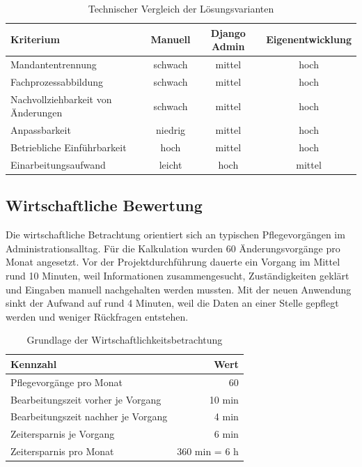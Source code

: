 \begin{table}[htbp]
\centering
\begin{tabular}{|p{4.6cm}|c|c|c|}
\hline
\textbf{Kriterium} & \textbf{Manuell} & \textbf{Django Admin} & \textbf{Eigenentwicklung} \\
\hline
Mandantentrennung & schwach & mittel & hoch \\
\hline
Fachprozessabbildung & schwach & mittel & hoch \\
\hline
Nachvollziehbarkeit von Änderungen & schwach & mittel & hoch \\
\hline
Anpassbarkeit & niedrig & mittel & hoch \\
\hline
Betriebliche Einführbarkeit & hoch & mittel & hoch \\
\hline
Einarbeitungsaufwand & leicht & hoch & mittel \\
\hline
\end{tabular}
\caption{Technischer Vergleich der Lösungsvarianten}
\label{tab:TechnischerVergleich}
\end{table}

\subsection{Wirtschaftliche Bewertung}
\label{sec:WirtschaftlicheBewertung}
Die wirtschaftliche Betrachtung orientiert sich an typischen Pflegevorgängen
im Administrationsalltag. Für die Kalkulation wurden 60 Änderungsvorgänge pro
Monat angesetzt. Vor der Projektdurchführung dauerte ein Vorgang im Mittel
rund 10 Minuten, weil Informationen zusammengesucht, Zuständigkeiten geklärt
und Eingaben manuell nachgehalten werden mussten. Mit der neuen Anwendung sinkt
der Aufwand auf rund 4 Minuten, weil die Daten an einer Stelle gepflegt werden
und weniger Rückfragen entstehen.

\begin{table}[htbp]
\centering
\begin{tabular}{|p{8.0cm}|r|}
\hline
\textbf{Kennzahl} & \textbf{Wert} \\
\hline
Pflegevorgänge pro Monat & 60 \\
\hline
Bearbeitungszeit vorher je Vorgang & 10 min \\
\hline
Bearbeitungszeit nachher je Vorgang & 4 min \\
\hline
Zeitersparnis je Vorgang & 6 min \\
\hline
Zeitersparnis pro Monat & 360 min = 6 h \\
\hline
\end{tabular}
\caption{Grundlage der Wirtschaftlichkeitsbetrachtung}
\label{tab:WirtschaftlichkeitGrundlage}
\end{table}

